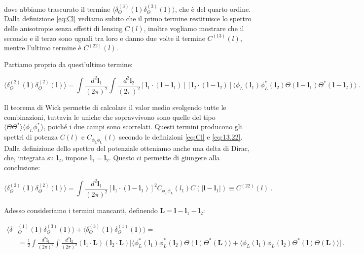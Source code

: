 \documentclass[a4paper,10pt]{article}
\newcommand{\B}{\boldsymbol}
\begin{document}
dove abbiamo trascurato il termine $\langle \delta_\Theta^{(3)}(\B l) \delta_\Theta^{(3)}(\B l) \rangle$, che è del quarto ordine.
Dalla definizione \eqref{eq:Cl} vediamo subito che il primo termine restituisce lo spettro delle anisotropie senza effetti di lensing $C(l)$, inoltre vogliamo mostrare che il secondo e il terzo sono uguali tra loro e danno due volte il termine $C^{(13)}(l)$, mentre l'ultimo termine è $C^{(22)}(l)$.

Partiamo proprio da quest'ultimo termine: 

\begin{equation}
    \langle \delta_\Theta^{(2)}(\B l) \delta_\Theta^{(2)}(\B l) \rangle = \int \frac{d^2 \B l_1}{(2\pi)^2} \int \frac{d^2 \B l_2}{(2\pi)^2} [\boldsymbol{l}_1 \cdot (\boldsymbol{l} - \boldsymbol{l}_1)][\boldsymbol{l}_2 \cdot (\boldsymbol{l} - \boldsymbol{l}_2)] \langle \phi_L(\boldsymbol{l}_1) \phi_L^*(\boldsymbol{l}_2) \Theta(\boldsymbol{l}-\boldsymbol{l}_1) \Theta^*(\boldsymbol{l}-\boldsymbol{l}_2)\rangle \ .
\end{equation}

Il teorema di Wick permette di calcolare il valor medio svolgendo tutte le combinazioni, tuttavia le uniche che sopravvivono sono quelle del tipo $\langle \Theta \Theta^* \rangle \langle \phi_L \phi_L^* \rangle$, poiché i due campi sono scorrelati.
Questi termini producono gli spettri di potenza $C(l)$ e $C_{\phi_{\text{L}}\phi_{\text{L}}}(l)$ secondo le definizioni \eqref{eq:Cl} e \eqref{eq:13.22}.
Dalla definizione dello spettro del potenziale otteniamo anche una delta di Dirac, che, integrata su $\B l_2$, impone $\B l_1 = \B l_2$.
Questo ci permette di giungere alla conclusione:

\begin{equation}
    \langle \delta_\Theta^{(2)}(\B l) \delta_\Theta^{(2)}(\B l) \rangle = \int \frac{d^2 \B l_1}{(2\pi)^2} [\boldsymbol{l}_1 \cdot (\boldsymbol{l} - \boldsymbol{l}_1)]^2 C_{\phi_L\phi_L}(l_1) C(|\B l - \B l_1|) \equiv C^{(22)}(l) \ .
\end{equation}

Adesso consideriamo i termini mancanti, definendo $\B L = \B l - \B l_1 - \B l_2$:

\begin{equation}
\begin{aligned}
    \langle \delta&_\Theta^{(1)}(\B l) \delta_\Theta^{(3)}(\B l) \rangle + \langle \delta_\Theta^{(3)}(\B l) \delta_\Theta^{(1)}(\B l) \rangle = \\
        & = \frac{1}{2} \int \frac{d^2 \B l_1}{(2\pi)^2} \int \frac{d^2 \B l_2}{(2\pi)^2} (\boldsymbol{l}_1 \cdot \boldsymbol{L})(\boldsymbol{l}_2 \cdot \boldsymbol{L}) \big[ \langle \phi_L^*(\boldsymbol{l}_1) \phi_L^*(\boldsymbol{l}_2) \Theta(\boldsymbol{l}) \Theta^*(\boldsymbol{L})\rangle + \langle \phi_L(\boldsymbol{l}_1) \phi_L(\boldsymbol{l}_2) \Theta^*(\boldsymbol{l}) \Theta(\boldsymbol{L}) \rangle \big] \ .
\end{aligned}
\end{equation}
\end{document}
